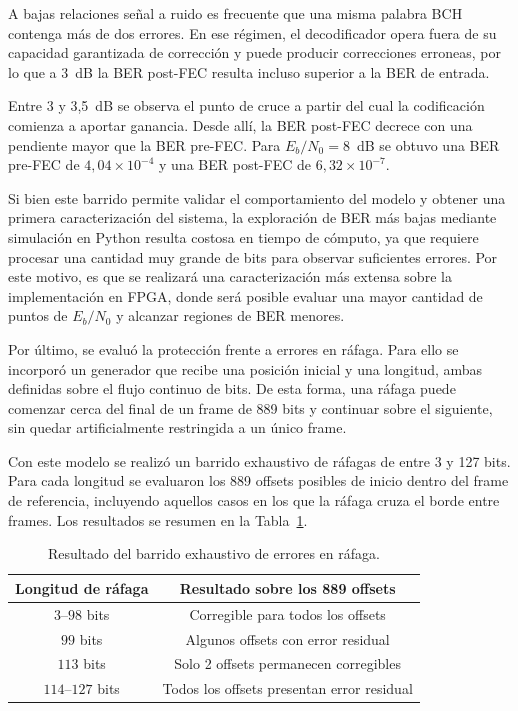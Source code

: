 \documentclass[10pt,a4paper]{article}
\begin{document}
A bajas relaciones señal a ruido es frecuente que una misma palabra BCH
contenga más de dos errores. En ese régimen, el decodificador opera fuera de
su capacidad garantizada de corrección y puede producir correcciones erroneas, 
por lo que a 3~dB la BER post-FEC resulta incluso superior a la BER de entrada.

Entre 3 y 3,5~dB se observa el punto de cruce a partir del cual la codificación
comienza a aportar ganancia. Desde allí, la BER post-FEC decrece con una
pendiente mayor que la BER pre-FEC. Para $E_b/N_0=8$~dB se obtuvo una BER
pre-FEC de $4{,}04\times10^{-4}$ y una BER post-FEC de
$6{,}32\times10^{-7}$.

Si bien este barrido permite validar el comportamiento del modelo y obtener una
primera caracterización del sistema, la exploración de BER más bajas mediante
simulación en Python resulta costosa en tiempo de cómputo, ya que requiere
procesar una cantidad muy grande de bits para observar suficientes errores.
Por este motivo, es que se realizará una caracterización más extensa sobre la
implementación en FPGA, donde será posible evaluar una mayor cantidad de
puntos de $E_b/N_0$ y alcanzar regiones de BER menores.

Por último, se evaluó la protección frente a errores en ráfaga. Para ello se
incorporó un generador que recibe una posición inicial y una longitud, ambas
definidas sobre el flujo continuo de bits. De esta forma, una ráfaga puede
comenzar cerca del final de un frame de 889 bits y continuar sobre el siguiente,
sin quedar artificialmente restringida a un único frame.

Con este modelo se realizó un barrido exhaustivo de ráfagas de entre 3 y
127 bits. Para cada longitud se evaluaron los 889 offsets posibles de inicio
dentro del frame de referencia, incluyendo aquellos casos en los que la ráfaga
cruza el borde entre frames. Los resultados se resumen en la
Tabla~\ref{tab:burst-sweep-python}.

\begin{table}[H]
    \centering
    \begin{tabular}{@{}cc@{}}
        \toprule
        \textbf{Longitud de ráfaga} & \textbf{Resultado sobre los 889 offsets} \\
        \midrule
        $3$--$98$ bits & Corregible para todos los offsets \\
        $99$ bits & Algunos offsets con error residual \\
        $113$ bits & Solo 2 offsets permanecen corregibles \\
        $114$--$127$ bits & Todos los offsets presentan error residual \\
        \bottomrule
    \end{tabular}
    \caption{Resultado del barrido exhaustivo de errores en ráfaga.}
    \label{tab:burst-sweep-python}
\end{table}
\end{document}
